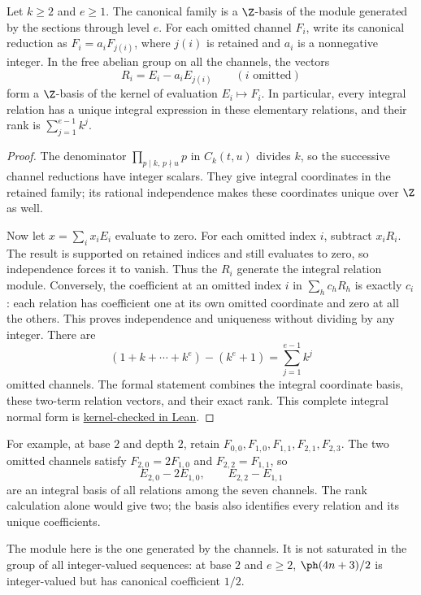 \documentclass[11pt]{article}
\begin{document}
\begin{corollary}\label{cor:integral-normal-form}
Let $k\ge2$ and $e\ge1$. The canonical family is a $\Z$-basis of the
module generated by the sections through level $e$. For each omitted
channel $F_i$, write its canonical reduction as $F_i=a_iF_{j(i)}$, where
$j(i)$ is retained and $a_i$ is a nonnegative integer. In the free abelian
group on all the channels, the vectors
\[
 R_i=E_i-a_iE_{j(i)}\qquad(i\text{ omitted})
\]
form a $\Z$-basis of the kernel of evaluation $E_i\mapsto F_i$.
In particular, every integral relation has a unique integral expression
in these elementary relations, and their rank is
$\sum_{j=1}^{e-1}k^j$.
\end{corollary}
\begin{proof}
The denominator $\prod_{p\mid k,\,p\nmid u}p$ in $C_k(t,u)$ divides $k$,
so the successive channel reductions have integer scalars. They give
integral coordinates in the retained family; its rational independence
makes these coordinates unique over $\Z$ as well.

Now let $x=\sum_i x_iE_i$ evaluate to zero. For each omitted index $i$,
subtract $x_iR_i$. The result is supported on retained indices and still
evaluates to zero, so independence forces it to vanish. Thus the $R_i$
generate the integral relation module. Conversely, the coefficient at
an omitted index $i$ in $\sum_h c_hR_h$ is exactly $c_i$: each relation
has coefficient one at its own omitted coordinate and zero at all the
others. This proves independence and uniqueness without dividing by
any integer. There are
\[
 (1+k+\cdots+k^e)-(k^e+1)=\sum_{j=1}^{e-1}k^j
\]
omitted channels. The formal statement combines the integral coordinate
basis, these two-term relation vectors, and their exact rank.
This complete integral normal form is \href{https://github.com/wcook04/plectis-erdos/blob/25ef6245d15a47548c6926369ae8f1a0f0a14a80/ErdosProblems/Erdos249/PaperCompleteR8/KernelRelationBasis.lean#L398}{kernel-checked in Lean}.
\end{proof}

For example, at base $2$ and depth $2$, retain
$F_{0,0},F_{1,0},F_{1,1},F_{2,1},F_{2,3}$. The two omitted channels satisfy
$F_{2,0}=2F_{1,0}$ and $F_{2,2}=F_{1,1}$, so
\[
 E_{2,0}-2E_{1,0},\qquad E_{2,2}-E_{1,1}
\]
are an integral basis of all relations among the seven channels. The
rank calculation alone would give two; the basis also identifies every
relation and its unique coefficients.

The module here is the one generated by the channels. It is not saturated
in the group of all integer-valued sequences: at base $2$ and $e\ge2$,
$\ph(4n+3)/2$ is integer-valued but has canonical coefficient $1/2$.
\end{document}
